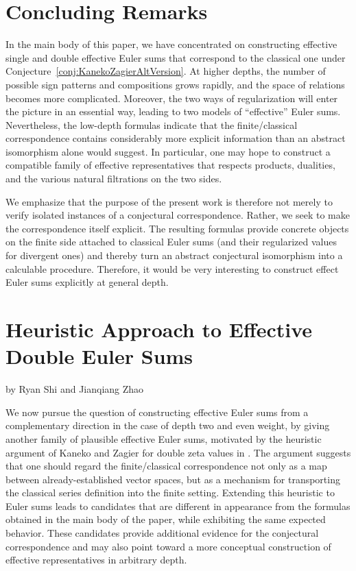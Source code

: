 \documentclass{article}
\theoremstyle{plain}
\theoremstyle{definition}
\begin{document}
\section{Concluding Remarks}
In the main body of this paper, we have concentrated on constructing effective single and double effective Euler sums that correspond to the classical one under Conjecture~\ref{conj:KanekoZagierAltVersion}. At higher depths, the number of possible sign patterns and compositions grows rapidly, and the space of relations becomes more complicated. Moreover, the two ways of regularization will enter the picture in an essential way, leading to two models of ``effective'' Euler sums. Nevertheless, the low-depth formulas indicate that the finite/classical correspondence contains considerably more explicit information than an abstract isomorphism alone would suggest. In particular, one may hope to construct a compatible family of effective representatives that respects products, dualities, and the various natural filtrations on the two sides.

We emphasize that the purpose of the present work is therefore not merely to verify isolated instances of a conjectural correspondence. Rather, we seek to make the correspondence itself explicit. The resulting formulas provide concrete objects on the finite side attached to classical Euler sums (and their regularized values for divergent ones) and thereby turn an abstract conjectural isomorphism into a calculable procedure. Therefore, it would be very interesting to construct effect Euler sums explicitly at general depth.


\bigskip

\appendix

\renewcommand{\thesection}{Appendix.}
\section{Heuristic Approach to Effective Double Euler Sums}

\begin{center}
by Ryan Shi and Jianqiang Zhao
\end{center}

\renewcommand{\thesection}{A}

\bigskip


We now pursue the question of constructing effective Euler sums from a complementary direction in the case of depth two and even weight, by giving another family of plausible effective Euler sums, motivated by the heuristic argument of Kaneko and Zagier for double zeta values in \cite{KanekoZa2026}. The argument suggests that one should regard the finite/classical correspondence not only as a map between already-established vector spaces, but as a mechanism for transporting the classical series definition into the finite setting. Extending this heuristic to Euler sums leads to candidates that are different in appearance from the formulas obtained in the main body of the paper, while exhibiting the same expected behavior. These candidates provide additional evidence for the conjectural correspondence and may also point toward a more conceptual construction of effective representatives in arbitrary depth.
\end{document}
